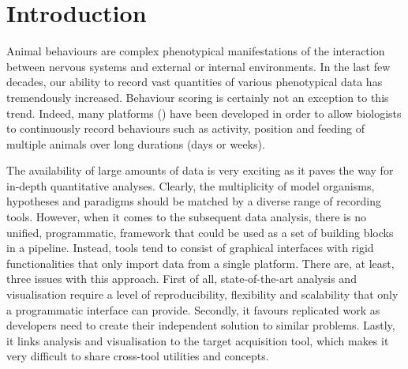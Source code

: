 \documentclass[10pt,letterpaper]{article}\usepackage[]{graphicx}\usepackage[]{color}
\newcommand{\citationneeded}[2][]{\todo[color=blue, fancyline, #1]{\textbf{Citation Needed:} #2}}
\begin{document}
\listoftodos


\linenumbers

\section*{Introduction}

Animal behaviours are complex phenotypical manifestations of the interaction between nervous systems and external or internal environments.
In the last few decades, our ability to record vast quantities of various phenotypical data has tremendously increased.
Behaviour scoring is certainly not an exception to this trend.
Indeed, many platforms (\citationneeded{}) have been developed in order to allow biologists to continuously record behaviours such as activity, position and feeding of multiple animals over long durations (days or weeks).

The availability of large amounts of data is very exciting as it paves the way for in-depth quantitative analyses.
Clearly, the multiplicity of model organisms, hypotheses and paradigms should be matched by a diverse range of recording tools.
However, when it comes to the subsequent data analysis, there is no unified, programmatic, framework that could be used as a set of building blocks in a pipeline.
Instead, tools tend to consist of graphical interfaces with rigid functionalities that only import data from a single platform.
There are, at least, three issues with this approach.
First of all, state-of-the-art analysis and visualisation require a level of reproducibility, flexibility and scalability that only a programmatic interface can provide.
Secondly, it favours replicated work as developers need to create their independent solution to similar problems.
Lastly, it links analysis and visualisation to the target acquisition tool, which makes it very difficult to share cross-tool utilities and concepts.
\end{document}
